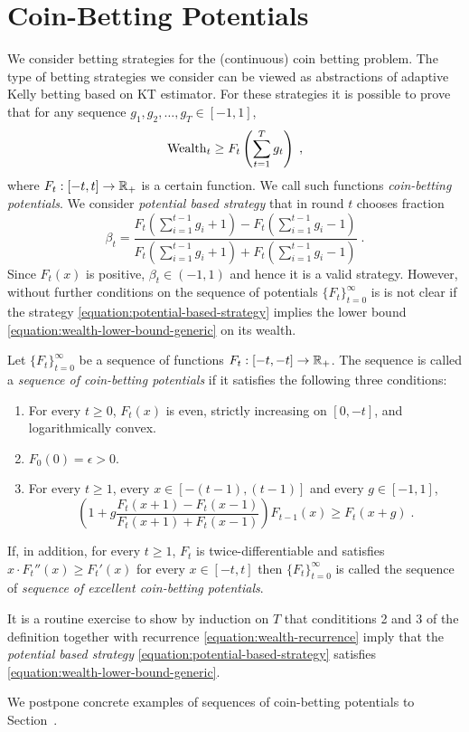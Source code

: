 \section{Coin-Betting Potentials}

We consider betting strategies for the (continuous) coin betting problem. The
type of betting strategies we consider can be viewed as abstractions of
adaptive Kelly betting based on KT estimator. For these strategies
it is possible to prove that for any sequence $g_1, g_2, \dots, g_T \in [-1,1]$,
\begin{equation}
\label{equation:wealth-lower-bound-generic}
\operatorname{Wealth}_t \ge F_t \left( \sum_{t=1}^T g_t \right) \; ,
\end{equation}
where $F_t:[-t,t] \to \mathbb{R}_+$ is a certain function. We call such functions
\emph{coin-betting potentials}. We consider \emph{potential based strategy}
that in round $t$ chooses fraction
\begin{equation}
\label{equation:potential-based-strategy}
\beta_t = \frac{F_t(\sum_{i=1}^{t-1} g_i + 1) - F_t(\sum_{i=1}^{t-1} g_i - 1)}{F_t(\sum_{i=1}^{t-1} g_i + 1) + F_t(\sum_{i=1}^{t-1} g_i - 1)} \; .
\end{equation}
Since $F_t(x)$ is positive, $\beta_t \in (-1,1)$ and hence it is a valid
strategy. However, without further conditions on the sequence of potentials
$\{F_t\}_{t=0}^\infty$ is is not clear if the strategy
\eqref{equation:potential-based-strategy} implies the lower bound
\eqref{equation:wealth-lower-bound-generic} on its wealth.

\begin{definition}
Let $\{F_t\}_{t=0}^\infty$ be a sequence of functions $F_t:[-t,-t] \to \mathbb{R}_+$. The
sequence is called a \emph{sequence of coin-betting potentials} if it satisfies
the following three conditions:
\begin{enumerate}
\item For every $t \ge 0$, $F_t(x)$ is even, strictly increasing on $[0,-t]$, and logarithmically convex.
\item $F_0(0) = \epsilon > 0$.
\item For every $t \ge 1$, every $x \in [-(t-1), (t-1)]$ and every $g \in [-1,1]$,
$$
\left(1 + g \frac{F_t(x + 1) - F_t(x - 1)}{F_t(x + 1) + F_t(x - 1)} \right) F_{t-1}(x) \ge F_t(x+g) \; .
$$
\end{enumerate}
If, in addition, for every $t \ge 1$, $F_t$ is twice-differentiable and
satisfies $x \cdot F_t''(x) \ge F_t'(x)$ for every $x \in [-t,t]$ then
$\{F_t\}_{t=0}^\infty$ is called the sequence of \emph{sequence of excellent
coin-betting potentials}.
\end{definition}

It is a routine exercise to show by induction on $T$ that condititions 2 and 3
of the definition together with recurrence \eqref{equation:wealth-recurrence}
imply that the \emph{potential based strategy}
\eqref{equation:potential-based-strategy} satisfies
\eqref{equation:wealth-lower-bound-generic}.

We postpone concrete examples of sequences of coin-betting potentials to
Section~\label{section:kt-estimator}.
